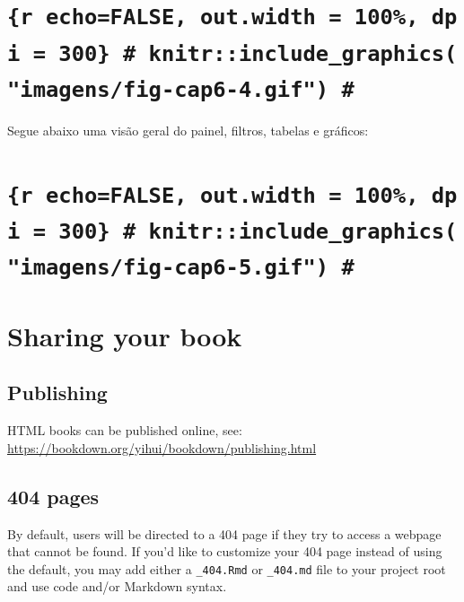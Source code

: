 \documentclass[
]{book}
\begin{document}
\hypertarget{r-echofalse-out.width-100-dpi-300-knitrinclude_graphicsimagensfig-cap6-4.gif}{%
\chapter{\texorpdfstring{\texttt{\{r\ echo=FALSE,\ out.width\ =\ \textquotesingle{}100\%\textquotesingle{},\ dpi\ =\ 300\}\ \#\ knitr::include\_graphics("imagens/fig-cap6-4.gif")\ \#}}{\{r echo=FALSE, out.width = '100\%', dpi = 300\} \# knitr::include\_graphics("imagens/fig-cap6-4.gif") \#}}\label{r-echofalse-out.width-100-dpi-300-knitrinclude_graphicsimagensfig-cap6-4.gif}}

Segue abaixo uma visão geral do painel, filtros, tabelas e gráficos:

\hypertarget{r-echofalse-out.width-100-dpi-300-knitrinclude_graphicsimagensfig-cap6-5.gif}{%
\chapter{\texorpdfstring{\texttt{\{r\ echo=FALSE,\ out.width\ =\ \textquotesingle{}100\%\textquotesingle{},\ dpi\ =\ 300\}\ \#\ knitr::include\_graphics("imagens/fig-cap6-5.gif")\ \#}}{\{r echo=FALSE, out.width = '100\%', dpi = 300\} \# knitr::include\_graphics("imagens/fig-cap6-5.gif") \#}}\label{r-echofalse-out.width-100-dpi-300-knitrinclude_graphicsimagensfig-cap6-5.gif}}

\hypertarget{sharing-your-book}{%
\chapter{Sharing your book}\label{sharing-your-book}}

\hypertarget{publishing}{%
\section{Publishing}\label{publishing}}

HTML books can be published online, see: \url{https://bookdown.org/yihui/bookdown/publishing.html}

\hypertarget{pages}{%
\section{404 pages}\label{pages}}

By default, users will be directed to a 404 page if they try to access a webpage that cannot be found. If you'd like to customize your 404 page instead of using the default, you may add either a \texttt{\_404.Rmd} or \texttt{\_404.md} file to your project root and use code and/or Markdown syntax.
\end{document}
